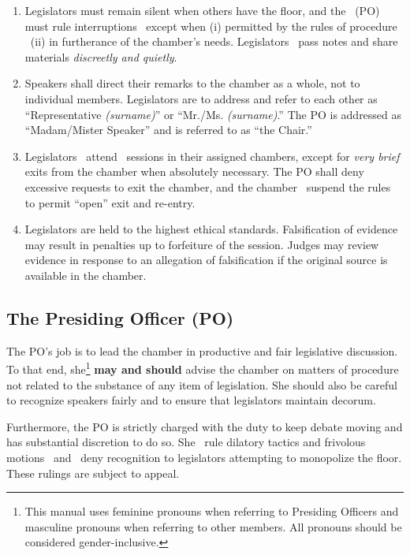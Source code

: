 \begin{enumerate}

\item
Legislators must remain silent when others have the floor, 
and the \po\ (PO) must rule interruptions \ooo\ except when 
(i) permitted by the rules of procedure 
\andd\ (ii) in furtherance of the chamber's needs.
Legislators \may\ pass notes and share materials \emph{discreetly and quietly}.

\item
Speakers shall direct their remarks to the chamber as a whole, 
not to individual members. 
Legislators are to address and refer to each other as 
``Representative \emph{(surname)}'' or ``Mr./Ms. \emph{(surname)}.'' 
The PO is addressed as ``Madam/Mister Speaker'' and is referred to as ``the Chair.''

\item
Legislators \must\ attend \all\ sessions in their assigned chambers, 
except for \emph{very brief} exits from the chamber when absolutely necessary. 
The PO shall deny excessive requests to exit the chamber, and the chamber \maynot\ 
suspend the rules to permit ``open'' exit and re-entry.

\item
Legislators are held to the highest ethical standards. 
Falsification of evidence may result in penalties up to forfeiture of the session. 
Judges may review evidence in response to an allegation of falsification if 
the original source is available in the chamber.

\end{enumerate}


\subsection{The Presiding Officer (PO)}\label{the_po}
The PO's job is to lead the chamber in productive and fair legislative discussion. 
To that end, she\footnote{ 
	This manual uses feminine pronouns when referring to Presiding Officers and 
	masculine pronouns when referring to other members. All pronouns should be 
	considered gender-inclusive.
} 
\textbf{may and should} advise the chamber on matters of procedure 
not related to the substance of any item of legislation. 
She should also be careful to recognize speakers fairly 
and to ensure that legislators maintain decorum.

Furthermore, the PO is strictly charged with the duty to keep debate moving 
and has substantial discretion to do so.
She \must\ rule dilatory tactics and frivolous motions \ooo\ 
and \may\ deny recognition to legislators attempting to monopolize the floor. 
These rulings are subject to appeal.

